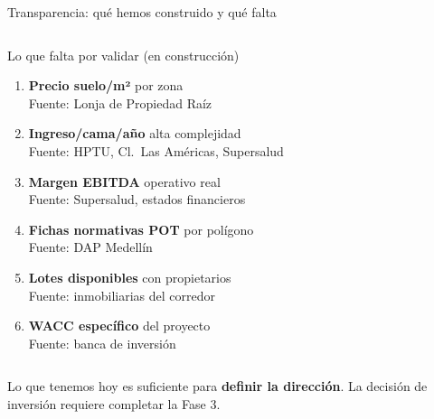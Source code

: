 \documentclass[aspectratio=169, 11pt]{beamer}
\begin{document}
\begin{frame}{Transparencia: qué hemos construido y qué falta}
\begin{columns}[T]
\begin{alertblock}{\small Lo que falta por validar (en construcción)}
\scriptsize
\begin{enumerate}\setlength{\itemsep}{1pt}
  \item[\textcolor{coral}{$\blacktriangledown$}] \textbf{Precio suelo/m²} por zona\\
    {\tiny Fuente: Lonja de Propiedad Raíz}
  \item[\textcolor{coral}{$\blacktriangledown$}] \textbf{Ingreso/cama/año} alta complejidad\\
    {\tiny Fuente: HPTU, Cl.\ Las Américas, Supersalud}
  \item[\textcolor{coral}{$\blacktriangledown$}] \textbf{Margen EBITDA} operativo real\\
    {\tiny Fuente: Supersalud, estados financieros}
  \item[\textcolor{coral}{$\blacktriangledown$}] \textbf{Fichas normativas POT} por polígono\\
    {\tiny Fuente: DAP Medellín}
  \item[\textcolor{coral}{$\blacktriangledown$}] \textbf{Lotes disponibles} con propietarios\\
    {\tiny Fuente: inmobiliarias del corredor}
  \item[\textcolor{amber}{$\blacktriangledown$}] \textbf{WACC específico} del proyecto\\
    {\tiny Fuente: banca de inversión}
\end{enumerate}
\end{alertblock}
\end{columns}

\vspace{4pt}
\begin{center}
{\small Lo que tenemos hoy es suficiente para \textbf{definir la dirección}. La decisión de inversión requiere completar la Fase 3.}
\end{center}
\end{frame}
\end{document}
